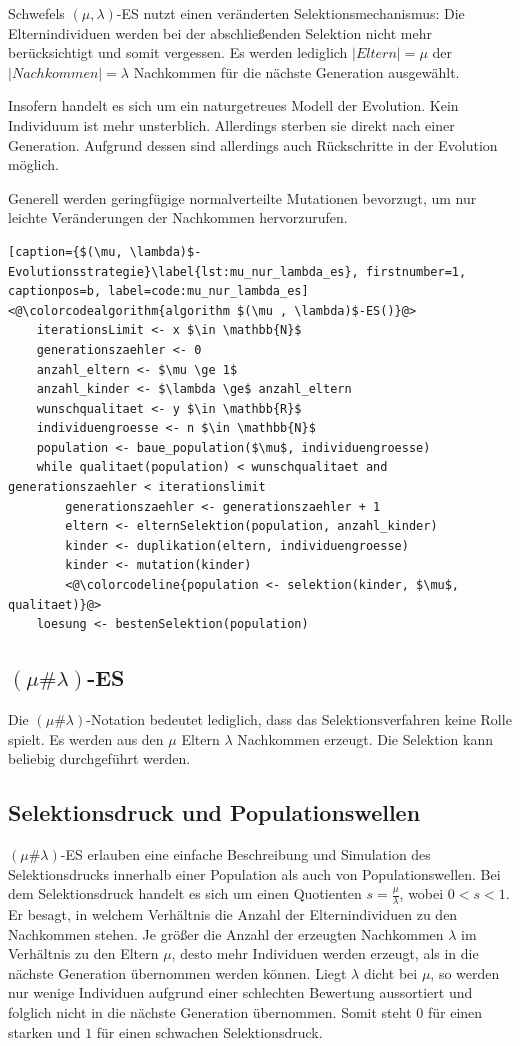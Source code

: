 Schwefels $(\mu, \lambda)$-ES nutzt einen veränderten Selektionsmechanismus:
Die Elternindividuen werden bei der abschließenden Selektion nicht mehr berücksichtigt und somit vergessen. Es werden lediglich $|Eltern| = \mu$ der $|Nachkommen| = \lambda$ Nachkommen für die nächste Generation ausgewählt.

Insofern handelt es sich um ein naturgetreues Modell der Evolution. Kein Individuum ist mehr unsterblich. Allerdings sterben sie direkt nach einer Generation. Aufgrund dessen sind allerdings auch Rückschritte in der Evolution möglich.

Generell werden geringfügige normalverteilte Mutationen bevorzugt, um nur leichte Veränderungen der Nachkommen hervorzurufen.

\begin{lstlisting}[caption={$(\mu, \lambda)$-Evolutionsstrategie}\label{lst:mu_nur_lambda_es}, firstnumber=1, captionpos=b, label=code:mu_nur_lambda_es]
<@\colorcodealgorithm{algorithm $(\mu , \lambda)$-ES()}@>
	iterationsLimit <- x $\in \mathbb{N}$
	generationszaehler <- 0
	anzahl_eltern <- $\mu \ge 1$
	anzahl_kinder <- $\lambda \ge$ anzahl_eltern
	wunschqualitaet <- y $\in \mathbb{R}$
	individuengroesse <- n $\in \mathbb{N}$
	population <- baue_population($\mu$, individuengroesse)
	while qualitaet(population) < wunschqualitaet and generationszaehler < iterationslimit
		generationszaehler <- generationszaehler + 1
		eltern <- elternSelektion(population, anzahl_kinder)
		kinder <- duplikation(eltern, individuengroesse)
		kinder <- mutation(kinder)
		<@\colorcodeline{population <- selektion(kinder, $\mu$, qualitaet)}@>
	loesung <- bestenSelektion(population)
\end{lstlisting}

\subsection{$(\mu \# \lambda)$-ES}

Die $(\mu \# \lambda)$-Notation bedeutet lediglich, dass das Selektionsverfahren keine Rolle spielt.
Es werden aus den $\mu$ Eltern $\lambda$ Nachkommen erzeugt. Die Selektion kann beliebig durchgeführt werden.

\subsection{Selektionsdruck und Populationswellen}

$(\mu \# \lambda)$-ES erlauben eine einfache Beschreibung und Simulation des Selektionsdrucks innerhalb einer Population als auch von Populationswellen.
Bei dem Selektionsdruck handelt es sich um einen Quotienten $s = \frac{\mu}{\lambda}$, wobei $0 < s < 1$.
Er besagt, in welchem Verhältnis die Anzahl der Elternindividuen zu den Nachkommen stehen.
Je größer die Anzahl der erzeugten Nachkommen $\lambda$ im Verhältnis zu den Eltern $\mu$, desto mehr Individuen werden erzeugt, als in die nächste Generation übernommen werden können.
Liegt $\lambda$ dicht bei $\mu$, so werden nur wenige Individuen aufgrund einer schlechten Bewertung aussortiert und folglich nicht in die nächste Generation übernommen.
Somit steht $0$ für einen starken und $1$ für einen schwachen Selektionsdruck.


